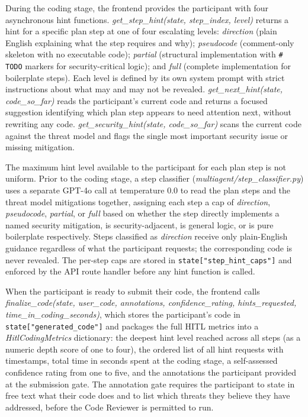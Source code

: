 During the coding stage, the frontend provides the participant with four asynchronous hint functions. \textit{get\_step\_hint(state, step\_index, level)} returns a hint for a specific plan step at one of four escalating levels: \textit{direction} (plain English explaining what the step requires and why); \textit{pseudocode} (comment-only skeleton with no executable code); \textit{partial} (structural implementation with \texttt{\# TODO} markers for security-critical logic); and \textit{full} (complete implementation for boilerplate steps). Each level is defined by its own system prompt with strict instructions about what may and may not be revealed. \textit{get\_next\_hint(state, code\_so\_far)} reads the participant's current code and returns a focused suggestion identifying which plan step appears to need attention next, without rewriting any code. \textit{get\_security\_hint(state, code\_so\_far)} scans the current code against the threat model and flags the single most important security issue or missing mitigation.

The maximum hint level available to the participant for each plan step is not uniform. Prior to the coding stage, a step classifier (\textit{multiagent/step\_classifier.py}) uses a separate GPT-4o call at temperature 0.0 to read the plan steps and the threat model mitigations together, assigning each step a cap of \textit{direction}, \textit{pseudocode}, \textit{partial}, or \textit{full} based on whether the step directly implements a named security mitigation, is security-adjacent, is general logic, or is pure boilerplate respectively. Steps classified as \textit{direction} receive only plain-English guidance regardless of what the participant requests; the corresponding code is never revealed. The per-step caps are stored in \texttt{state["step\_hint\_caps"]} and enforced by the API route handler before any hint function is called.

When the participant is ready to submit their code, the frontend calls \textit{finalize\_code(state, user\_code, annotations, confidence\_rating, hints\_requested, time\_in\_coding\_seconds)}, which stores the participant's code in \texttt{state["generated\_code"]} and packages the full HITL metrics into a \textit{HitlCodingMetrics} dictionary: the deepest hint level reached across all steps (as a numeric depth score of one to four), the ordered list of all hint requests with timestamps, total time in seconds spent at the coding stage, a self-assessed confidence rating from one to five, and the annotations the participant provided at the submission gate. The annotation gate requires the participant to state in free text what their code does and to list which threats they believe they have addressed, before the Code Reviewer is permitted to run.

